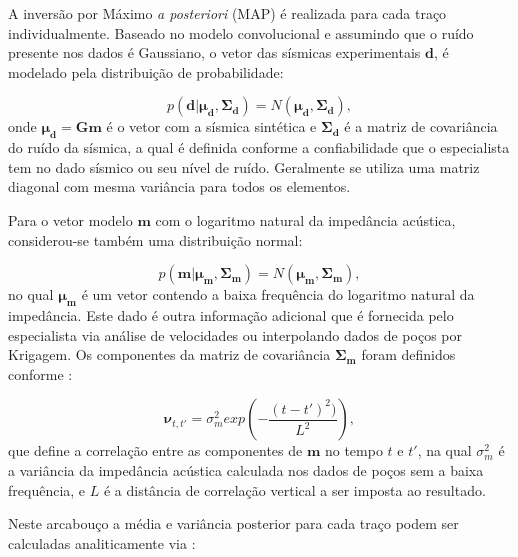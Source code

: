 A inversão por Máximo \textit{a posteriori} (MAP)
\citep{Buland01012003,leandroGRSL} é realizada para cada traço individualmente.
Baseado no modelo convolucional e assumindo que o ruído presente nos dados é
Gaussiano, o vetor das sísmicas experimentais $\boldsymbol{d}$, é modelado pela
distribuição de probabilidade:

\begin{equation}
p(\boldsymbol{d}|\boldsymbol{\mu_{d}},\boldsymbol{\Sigma_{d}}) =
N(\boldsymbol{\mu_{d}},\boldsymbol{\Sigma_{d}}),
\end{equation}
onde $\boldsymbol{\mu_{d}} = \boldsymbol{Gm}$ é o vetor com a sísmica
sintética e $\boldsymbol{\Sigma_{d}}$ é a matriz de covariância do ruído da
sísmica, a qual é definida conforme a confiabilidade que o especialista tem no
dado sísmico ou seu nível de ruído. Geralmente se utiliza uma matriz diagonal
com mesma variância para todos os elementos.

Para o vetor modelo $\boldsymbol{m}$ com o logaritmo natural da impedância
acústica, considerou-se também uma distribuição normal:

\begin{equation}
p(\boldsymbol{m}|\boldsymbol{\mu_{m}},\boldsymbol{\Sigma_{m}}) =
N(\boldsymbol{\mu_{m}},\boldsymbol{\Sigma_{m}}),
\end{equation} 
no qual $\boldsymbol{\mu_{m}}$ é um vetor contendo a baixa frequência do
logaritmo natural da impedância. Este dado é outra informação adicional que é
fornecida pelo especialista via análise de velocidades ou interpolando
dados de poços por Krigagem. Os componentes da matriz de covariância
$\boldsymbol{\Sigma_{m}}$ foram definidos conforme \citep{leandroGRSL}:

\begin{equation}
\label{eq:correlVert}
\boldsymbol{\nu}_{t,t'} = \sigma_{m}^{2} exp \left (-\frac{(t-t')^2)}{L^2}
\right ),
\end{equation} 
que define a correlação entre as componentes de $\boldsymbol{m}$ no tempo $t$ e
$t'$, na qual $\sigma_{m}^{2}$ é a variância da impedância acústica calculada
nos dados de poços sem a baixa frequência, e $L$ é a distância de correlação
vertical a ser imposta ao resultado.

Neste arcabouço a média e variância posterior para cada traço podem ser
calculadas analiticamente via \citep{leandroGRSL}:

